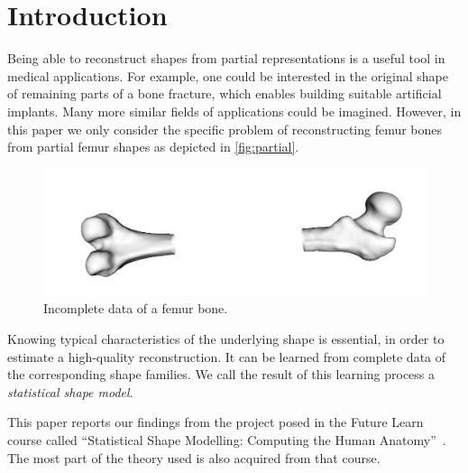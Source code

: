 \section{Introduction}
\label{sec:intro}


Being able to reconstruct shapes from partial representations is a useful tool in medical applications.
For example, one could be interested in the original shape of remaining parts of a bone fracture, which enables building suitable artificial implants.
Many more similar fields of applications could be imagined.
However, in this paper we only consider the specific problem of reconstructing femur bones from partial femur shapes as depicted in \autoref{fig:partial}.
\begin{figure}[b]
	\centering
  \includegraphics[scale=.15]{./Figures/partial_femur}
  \caption{Incomplete data of a femur bone.}
  \label{fig:partial}
\end{figure}

Knowing typical characteristics of the underlying shape is essential, in order to estimate a high-quality reconstruction.
It can be learned from complete data of the corresponding shape families.
We call the result of this learning process a \emph{statistical shape model}.

This paper reports our findings from the project posed in the Future Learn course called ``Statistical Shape Modelling: Computing the Human Anatomy''~\cite{mooc2019statistical}.
The most part of the theory used is also acquired from that course.
